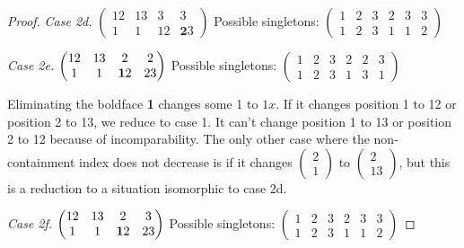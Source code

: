 \documentclass[11pt]{amsart}
\begin{document}
\begin{proof}
\textit{Case 2d.}
$\begin{pmatrix}
12 & 13 & 3 & 3\\
1 & 1 & 12 & \textbf{2}3 
\end{pmatrix}$
Possible singletons: 
$\begin{pmatrix}
1 & 2 & 3 & 2 & 3 & 3\\
1 & 2 & 3 & 1 & 1 & 2
\end{pmatrix}$

\textit{Case 2e.}
$\begin{pmatrix}
12 & 13 & 2 & 2\\
1 & 1 & {\bf 1}2 & 23 
\end{pmatrix}$
Possible singletons: 
$\begin{pmatrix}
1 & 2 & 3 & 2 & 2 & 3\\
1 & 2 & 3 & 1 & 3 & 1
\end{pmatrix}$

Eliminating the boldface {\bf 1} changes some 1 to $1x$. If it changes position 1 to 12 or position 2 to 13, we reduce to case 1. It can't change position 
1 to 13 or position 2 to 12 because of incomparability. The only other case where the non-containment index does not decrease is if it changes 
$\begin{pmatrix}
2 \\
1
\end{pmatrix}$ to
$\begin{pmatrix}
2 \\
13
\end{pmatrix}$, but this is a reduction to a situation isomorphic to case 2d.

\textit{Case 2f.}
$\begin{pmatrix}
12 & 13 & 2 & 3\\
1 & 1 & {\bf 1}2 & 23 
\end{pmatrix}$
Possible singletons: 
$\begin{pmatrix}
1 & 2 & 3 & 2 & 3 & 3\\
1 & 2 & 3 & 1 & 1 & 2
\end{pmatrix}$



\end{proof}
\end{document}
